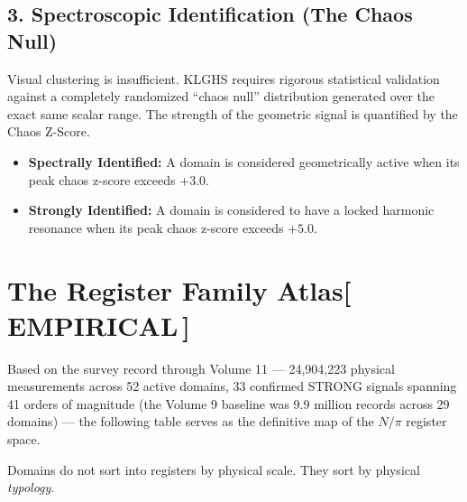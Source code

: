 \documentclass[12pt,oneside]{book}
\newcommand{\EmpiricalTag}{\;\colorbox{empiricaltag!15}{\textcolor{empiricaltag}{\footnotesize\bfseries [\,EMPIRICAL\,]}}}
\begin{document}
\subsection{3. Spectroscopic Identification (The Chaos Null)}
Visual clustering is insufficient. KLGHS requires rigorous statistical validation against a completely randomized ``chaos null'' distribution generated over the exact same scalar range. The strength of the geometric signal is quantified by the Chaos Z-Score.

\begin{itemize}
    \item \textbf{Spectrally Identified:} A domain is considered geometrically active when its peak chaos z-score exceeds $\mathbf{+3.0}$.
    \item \textbf{Strongly Identified:} A domain is considered to have a locked harmonic resonance when its peak chaos z-score exceeds $\mathbf{+5.0}$.
\end{itemize}

\section{The Register Family Atlas\EmpiricalTag}

Based on the survey record through Volume 11 --- 24{,}904{,}223 physical measurements across 52 active domains, 33 confirmed STRONG signals spanning 41 orders of magnitude (the Volume 9 baseline was 9.9 million records across 29 domains) --- the following table serves as the definitive map of the $N/\pi$ register space. 

Domains do not sort into registers by physical scale. They sort by physical \textit{typology}.
\end{document}
